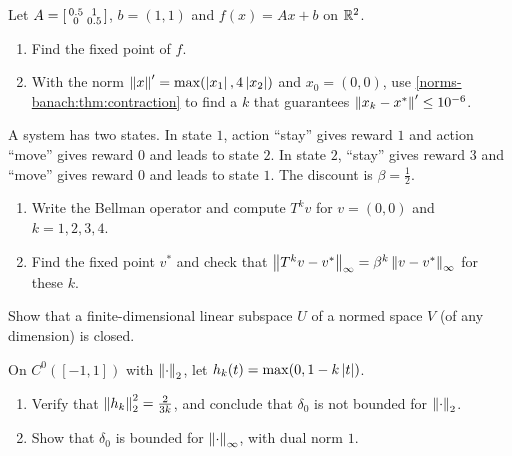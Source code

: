 \begin{notechapter}
\begin{exercise}\label{norms-banach:exr:6}
Let $A = \begin{bsmallmatrix}0.5 & 1\\0 & 0.5\end{bsmallmatrix}$,
$b = (1, 1)$ and $f(x) = Ax + b$ on $\mathbb{R}^2$.
\begin{enumerate}[nosep]
  \item Find the fixed point of $f$.
  \item With the norm $\left\|x\right\|' = \max(\left|x_1\right|, 4\left|x_2\right|)$ and
        $x_0 = (0, 0)$, use \cref{norms-banach:thm:contraction} to find a
        $k$ that guarantees $\left\|x_k - x^*\right\|'\leq10^{-6}$.
\end{enumerate}
\end{exercise}

\begin{exercise}\label{norms-banach:exr:7}
A system has two states. In state $1$, action ``stay'' gives reward $1$
and action ``move'' gives reward $0$ and leads to state $2$. In state $2$,
``stay'' gives reward $3$ and ``move'' gives reward $0$ and leads to
state $1$. The discount is $\beta = \frac12$.
\begin{enumerate}[nosep]
  \item Write the Bellman operator and compute $T^kv$ for $v = (0, 0)$ and
        $k = 1, 2, 3, 4$.
  \item Find the fixed point $v^*$ and check that
        $\left\|T^kv - v^*\right\|_\infty = \beta^k\left\|v - v^*\right\|_\infty$ for
        these $k$.
\end{enumerate}
\end{exercise}

\begin{exercise}\label{norms-banach:exr:8}
Show that a finite-dimensional linear subspace $U$ of a normed space $V$
(of any dimension) is closed.
\end{exercise}

\begin{exercise}\label{norms-banach:exr:9}
On $C^0([-1, 1])$ with $\left\|\cdot\right\|_2$, let
$h_k(t) = \max(0, 1 - k\left|t\right|)$.
\begin{enumerate}[nosep]
  \item Verify that $\left\|h_k\right\|_2^2 = \frac2{3k}$, and conclude that
        $\delta_0$ is not bounded for $\left\|\cdot\right\|_2$.
  \item Show that $\delta_0$ is bounded for $\left\|\cdot\right\|_\infty$, with dual
        norm $1$.
\end{enumerate}
\end{exercise}
\end{notechapter}
